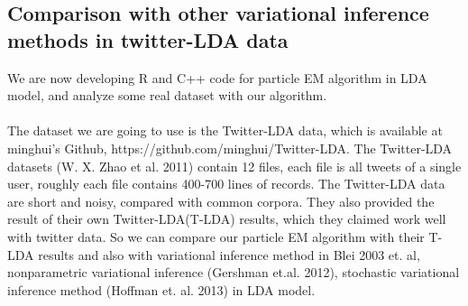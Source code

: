 \documentclass{article}
\begin{document}
\subsection{Comparison with other variational inference methods in twitter-LDA data}
We are now developing R and C++ code for particle EM algorithm in LDA model, and analyze some real dataset with our algorithm.\\
\\
The dataset we are going to use is the Twitter-LDA data, which is available at minghui’s Github, https://github.com/minghui/Twitter-LDA. The Twitter-LDA datasets (W. X. Zhao et al. 2011) contain 12 files, each file is all tweets of a single user, roughly each file contains 400-700 lines of records. The Twitter-LDA data are short and noisy, compared with common corpora. They also provided the result of their own Twitter-LDA(T-LDA) results, which they claimed work well with twitter data. So we can compare our particle EM algorithm with their T-LDA results and also with variational inference method in Blei 2003 et. al, nonparametric variational inference (Gershman et.al. 2012), stochastic variational inference method (Hoffman et. al. 2013) in LDA model.
\end{document}
